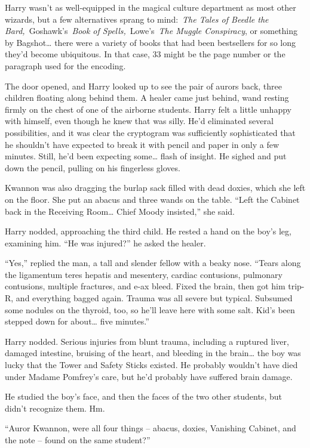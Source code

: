 Harry wasn't as well-equipped in the magical culture department as most
other wizards, but a few alternatives sprang to mind:~\emph{The Tales of
Beedle the Bard,}~Goshawk's~\emph{Book of Spells,}~Lowe's~\emph{The
Muggle Conspiracy}, or something by Bagshot\ldots{} there were a variety
of books that had been bestsellers for so long they'd become ubiquitous.
In that case, 33 might be the page number or the paragraph used for the
encoding.

The door opened, and Harry looked up to see the pair of aurors back,
three children floating along behind them. A healer came just behind,
wand resting firmly on the chest of one of the airborne students. Harry
felt a little unhappy with himself, even though he knew that was silly.
He'd eliminated several possibilities, and it was clear the cryptogram
was sufficiently sophisticated that he shouldn't have expected to break
it with pencil and paper in only a few minutes. Still, he'd been
expecting some\ldots{} flash of insight. He sighed and put down the
pencil, pulling on his fingerless gloves.

Kwannon was also dragging the burlap sack filled with dead doxies, which
she left on the floor. She put an abacus and three wands on the table.
``Left the Cabinet back in the Receiving Room\ldots{} Chief Moody
insisted,'' she said.

Harry nodded, approaching the third child. He rested a hand on the boy's
leg, examining him. ``He was injured?'' he asked the healer.

``Yes,'' replied the man, a tall and slender fellow with a beaky nose.
``Tears along the ligamentum teres hepatis and mesentery, cardiac
contusions, pulmonary contusions, multiple fractures, and e-ax bleed.
Fixed the brain, then got him trip-R, and everything bagged again.
Trauma was all severe but typical. Subsumed some nodules on the thyroid,
too, so he'll leave here with some salt. Kid's been stepped down for
about\ldots{} five minutes.''

Harry nodded. Serious injuries from blunt trauma, including a ruptured
liver, damaged intestine, bruising of the heart, and bleeding in the
brain\ldots{} the boy was lucky that the Tower and Safety Sticks
existed. He probably wouldn't have died under Madame Pomfrey's care, but
he'd probably have suffered brain damage.

He studied the boy's face, and then the faces of the two other students,
but didn't recognize them. Hm.

``Auror Kwannon, were all four things -- abacus, doxies, Vanishing
Cabinet, and the note -- found on the same student?''

